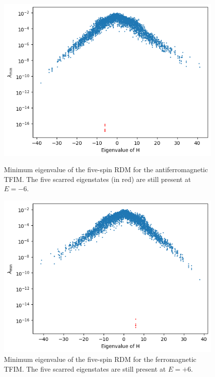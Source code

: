 \documentclass{article}
\begin{document}
\begin{figure}[h]
    \centering
    \begin{minipage}{0.45\textwidth}
        \centering
        \includegraphics[width=\linewidth]{5spins.png}
        \caption{Minimum eigenvalue of the five-spin RDM for the antiferromagnetic TFIM. The five scarred eigenstates (in red) are still present at $E = -6$.}
        \label{fig:5spins_anti}
    \end{minipage}\hfill
    \begin{minipage}{0.45\textwidth}
        \centering
        \includegraphics[width=\linewidth]{5spins-ferro.png}
        \caption{Minimum eigenvalue of the five-spin RDM for the ferromagnetic TFIM. The five scarred eigenstates are still present at $E = +6$.}
        \label{fig:5spins_ferro}
    \end{minipage}
\end{figure}
\end{document}
